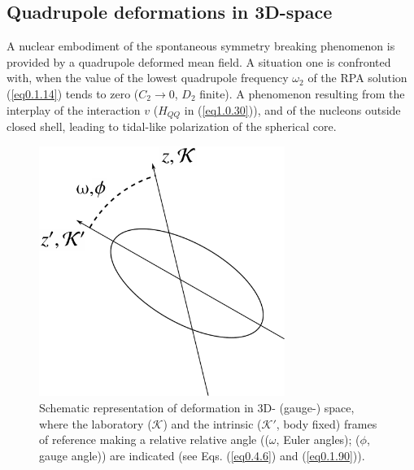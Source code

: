 \subsection{Quadrupole deformations in 3D-space}
A nuclear embodiment of the spontaneous symmetry breaking phenomenon is provided by a quadrupole deformed  mean field. A situation one is confronted with, when the value of the lowest quadrupole frequency $\omega_2$ of the RPA solution (\ref{eq0.1.14}) tends to zero ($C_2\to0$, $D_2$ finite). A phenomenon resulting from the interplay of the interaction $v$ ($H_{QQ}$ in (\ref{eq1.0.30})), and of the nucleons outside closed shell, leading to tidal-like polarization of the spherical core.
\begin{figure}
	\centerline {
		\includegraphics*[width=8cm, angle=0.]{introduccion/figs/fig0_4_4}
	}
	\caption{Schematic representation of deformation in  3D- (gauge-) space, where the laboratory ($\mathcal K$) and the intrinsic ($\mathcal K'$, body fixed) frames of reference making a relative relative angle (($\omega$, Euler angles); ($\phi$, gauge angle)) are  indicated (see Eqs. (\ref{eq0.4.6}) and (\ref{eq0.1.90})).}
	\label{fig0.4.4}
\end{figure}
